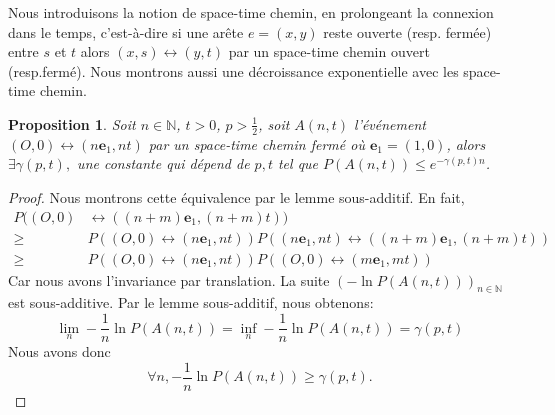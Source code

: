 \documentclass[titlepage,a4paper,12pt]{article}
\newcounter{prop}
\newtheorem{stc}[prop]{Proposition}
\newtheorem{tension}[prop]{Proposition}
\begin{document}
Nous introduisons la notion de space-time chemin, en prolongeant la connexion dans le temps, c'est-à-dire si une arête $e=(x,y)$ reste ouverte (resp. fermée) entre $s$ et $t$ alors $(x,s)\longleftrightarrow (y,t)$ par un space-time chemin ouvert (resp.fermé). Nous montrons aussi une décroissance exponentielle avec les space-time chemin.

\begin{stc} \label{stc} Soit $n\in \mathbb{N}$, $t>0$, $p> \frac{1}{2}$, soit $ A(n,t)$ l'événement $(O,0) \leftrightarrow (n\mathbf{e}_1,nt)$ par un space-time chemin fermé où $\mathbf{e}_1 = (1,0)$, alors $\exists \gamma(p,t),$ une constante qui dépend de $p,t$ tel que $P(A(n,t)) \leqslant e^{-\gamma(p,t)n}$.
\end{stc}

\begin{proof}
Nous montrons cette équivalence par le lemme sous-additif. En fait, 
\begin{align*}
P((O,0)& \leftrightarrow ((n+m)\mathbf{e}_1,(n+m)t)) \\
\geqslant & P((O,0)\leftrightarrow (n\mathbf{e}_1,nt))P((n\mathbf{e}_1,nt)\leftrightarrow ((n+m)\mathbf{e}_1,(n+m)t))\\
\geqslant & P((O,0)\leftrightarrow (n\mathbf{e}_1,nt))P((O,0)\leftrightarrow (m\mathbf{e}_1,mt))
\end{align*}
Car nous avons l'invariance par translation. La suite $(-\ln P(A(n,t)))_{n\in \mathbb{N}}$ est sous-additive. Par le lemme sous-additif, nous obtenons:
$$
\lim_{n}-\frac{1}{n}\ln P(A(n,t)) = \inf_{n} -\frac{1}{n}\ln P(A(n,t)) = \gamma(p,t)
$$
Nous avons donc
$$ \forall n, -\frac{1}{n}\ln P(A(n,t)) \geqslant \gamma(p,t).
$$
\end{proof}

\begin{comment}
Nous étudions la constante $\gamma(p,t)$ et nous avons la proposition suivante:
\begin{tension}$\frac{\gamma(p,t)}{\gamma(p,0)} \rightarrow 1$ quand $p\rightarrow 1$.
\end{tension}
\begin{proof}
Nous utilisons le fait que $\lim_n \frac{1}{n}\ln P(O\longleftrightarrow n\mathbf{e}_1) = \lim_n \frac{1}{n}\ln P(O\longleftrightarrow \partial \Lambda_n)$ et nous considérons une boite de taille $n$. Nous remarquons le nombre d'arête qui se ferme entre $[0,t]$ est borné par une loi de Poisson de paramètre $n^2(1-p)t$. Nous notons $N$ le nombre de bout d'un space-time chemin, c'est-à-dire le nombre de chemins fermés tel que $$ (O,0) = (x_1,\theta_1) \longleftrightarrow (x_1,\theta_2) \longleftrightarrow (x_2,\theta_2)\dots \longleftrightarrow (x_N,\theta_N) \longleftrightarrow (\partial\Lambda_n,t).
$$
Nous avons donc $N$ est borné par une variable aléatoire de loi de Poisson de paramètre $n^2(1-p)t$. Quand $p\rightarrow 1$, nous pouvons rendre $N$ d'ordre de 1 avec une probabilité proche de 1 et nous avons le résultat.
\end{proof}
\end{comment}
\end{document}
